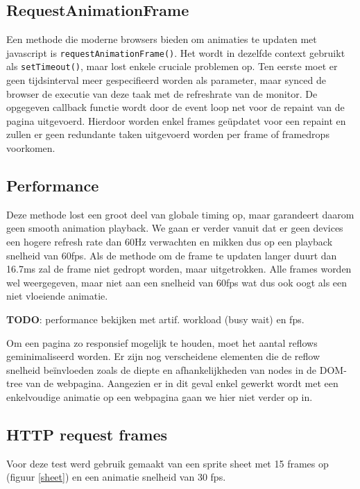 \subsection{RequestAnimationFrame}

Een methode die moderne browsers bieden om animaties te updaten met javascript is \texttt{requestAnimationFrame()}. Het wordt in dezelfde context gebruikt als \texttt{setTimeout()}, maar lost enkele cruciale problemen op. Ten eerste moet er geen tijdsinterval meer gespecifieerd worden als parameter, maar synced de browser de executie van deze taak met de refreshrate van de monitor. De opgegeven callback functie wordt door de event loop net voor de repaint van de pagina uitgevoerd. Hierdoor worden enkel frames geüpdatet voor een repaint en zullen er geen redundante taken uitgevoerd worden per frame of framedrops voorkomen. \cite{requestFrameDocs}

\subsection{Performance} \label{performance}
Deze methode lost een groot deel van globale timing op, maar garandeert daarom geen smooth animation playback. We gaan er verder vanuit dat er geen devices een hogere refresh rate dan 60Hz verwachten en mikken dus op een playback snelheid van 60fps. Als de methode om de frame te updaten langer duurt dan 16.7ms zal de frame niet gedropt worden, maar uitgetrokken. Alle frames worden wel weergegeven, maar niet aan een snelheid van 60fps wat dus ook oogt als een niet vloeiende animatie.

\textbf{TODO}: performance bekijken met artif. workload (busy wait) en fps.

Om een pagina zo responsief mogelijk te houden, moet het aantal reflows geminimaliseerd worden. Er zijn nog verscheidene elementen die de reflow snelheid beïnvloeden zoals de diepte en afhankelijkheden van nodes in de DOM-tree van de webpagina. Aangezien er in dit geval enkel gewerkt wordt met een enkelvoudige animatie op een webpagina gaan we hier niet verder op in.
\cite{improvePerformance}

\subsection{HTTP request frames}

Voor deze test werd gebruik gemaakt van een sprite sheet met 15 frames op (figuur \ref{sheet}) en een animatie snelheid van 30 fps.

